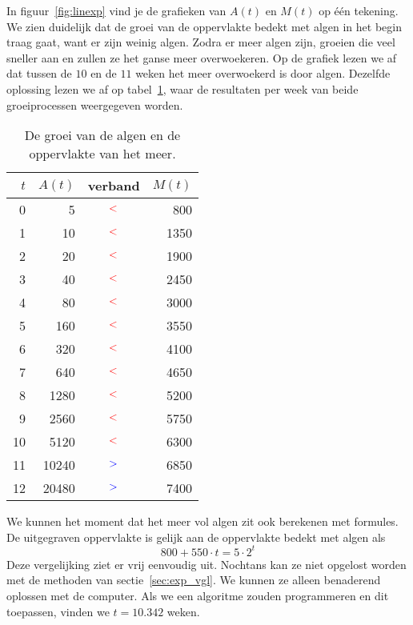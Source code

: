 In figuur~\ref{fig:linexp} vind je de grafieken van $A(t)$ en
$M(t)$ op \'{e}\'{e}n tekening. We zien duidelijk
dat de groei van de oppervlakte bedekt met algen
in het begin traag gaat, want er zijn weinig algen. Zodra
er meer algen zijn, groeien die veel sneller aan en zullen ze
het ganse meer overwoekeren. Op de grafiek lezen we af dat
tussen de $10$ en de $11$ weken het meer overwoekerd is door algen.
Dezelfde oplossing lezen we af op
tabel~\ref{tbl:meeralgen}, waar de resultaten per week van beide
groeiprocessen weergegeven worden.
\begin{table}[htb]
    \centering
    \caption{De groei van de algen en de oppervlakte van het meer.}
    \begin{tabular}{rrcr}
    \toprule
    $t$ & $A(t)$ & verband & $M(t)$  \\
    \midrule
    0 & 5 & ${\color{red}<}$ & 800  \\
    1 & 10 & ${\color{red}<}$ & 1350  \\
    2 & 20 & ${\color{red}<}$ & 1900  \\
    3 & 40 &  ${\color{red}<}$ & 2450  \\
    4 & 80 &  ${\color{red}<}$ & 3000  \\
    5 & 160 &  ${\color{red}<}$ & 3550  \\
    6 & 320 &  ${\color{red}<}$ & 4100  \\
    7 & 640 &  ${\color{red}<}$ & 4650  \\
    8 & 1280 &  ${\color{red}<}$ & 5200  \\
    9 & 2560 & ${\color{red}<}$ & 5750  \\
    10 & 5120 &  ${\color{red}<}$ & 6300  \\
    \cmidrule{2-4}
    11 & 10240 & ${\color{blue}>}$ & 6850  \\
    12 & 20480 & ${\color{blue}>}$ & 7400 \\
    \bottomrule
\end{tabular}
    \label{tbl:meeralgen}
\end{table}

We kunnen het moment dat het meer vol algen zit ook berekenen met formules. De uitgegraven oppervlakte is gelijk aan de oppervlakte bedekt met algen als
\begin{displaymath}
    800+550\cdot t=5\cdot 2^{t}
\end{displaymath}
Deze vergelijking ziet er vrij eenvoudig uit. Nochtans kan ze niet
opgelost worden met de methoden van sectie~\ref{sec:exp_vgl}.  We kunnen ze alleen
 benaderend oplossen met de computer. Als we een algoritme zouden programmeren en dit toepassen, vinden we $t=\num{10.342}$ weken. \\
 
